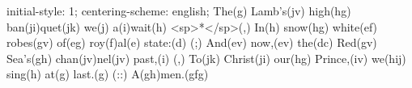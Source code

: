 initial-style: 1;
centering-scheme: english;
The(g) Lamb's(jv) high(hg) ban(ji)quet(jk) we(j) a(i)wait(h) <sp>*</sp>(,)
In(h) snow(hg) white(ef) robes(gv) of(eg) roy(f)al(e) state:(d) (;)
And(ev) now,(ev) the(dc) Red(gv) Sea's(gh) chan(jv)nel(jv) past,(i) (,)
To(jk) Christ(ji) our(hg) Prince,(iv) we(hij) sing(h) at(g) last.(g) (::)
A(gh)men.(gfg)

